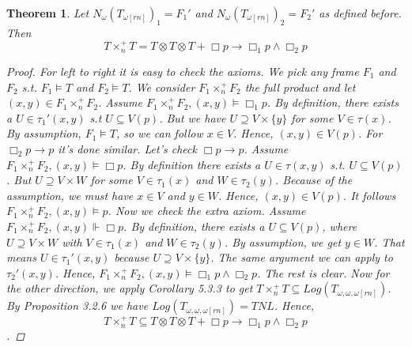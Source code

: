 \documentclass[12pt, a4paper]{scrartcl}
\newtheorem{theorem}[definition]{Theorem}
\begin{document}
    \begin{theorem}
        Let $N_\omega(T_{\omega[rn]})_1 = F_1'$ and $N_\omega(T_{\omega[rn]})_2 = F_2'$ as defined before. Then 
        $$T \times^+_n T = T \otimes T \otimes T + \Box p \rightarrow \Box_1 p \land \Box_2 p$$

        \begin{proof}
            For left to right it is easy to check the axioms. We pick any frame $F_1$ and $F_2$ s.t.
            $F_1 \vDash T$ and $F_2 \vDash T$. We consider $F_1 \times^+_n F_2$ the full product and let $(x,y) \in F_1 \times^+_n F_2$. \newline
            Assume $F_1 \times^+_n F_2,(x,y) \vDash \Box_1 p$. By definition, there exists a $U \in \tau_1'(x,y)$ s.t $U \subseteq V(p)$.
            But we have $U \supseteq V \times \{y\}$ for some $V \in \tau(x)$. By assumption, $F_1 \vDash T$, so we can follow $x \in V$. Hence, $(x,y) \in V(p)$. For $\Box_2p \rightarrow p$ it's done similar. \newline Let's check $\Box p \rightarrow p$.
            Assume $F_1 \times^+_n F_2,(x,y) \vDash \Box p$. By definition there exists a $U \in \tau(x,y)$ s.t. $U \subseteq V(p)$. But $U \supseteq V \times W$ for some $V \in \tau_1(x)$ and $W \in \tau_2(y)$.
            Because of the assumption, we must have $x \in V$ and $y \in W$. Hence, $(x,y) \in V(p)$. It follows $F_1 \times^+_n F_2,(x,y) \vDash p$. \newline
            Now we check the extra axiom.  Assume $F_1 \times^+_n F_2,(x,y) \Vdash \Box p$. By definition, there exists a $U \subseteq V(p)$, where $U \supseteq V \times W$ with $V \in \tau_1(x)$ and $W \in \tau_2(y)$. By assumption, we get $y \in W$. That means $U \in \tau_1'(x,y)$ 
            because $U \supseteq V \times \{y\}$. The same argument we can apply to $\tau_2'(x,y)$. Hence, $F_1 \times^+_n F_2,(x,y) \vDash \Box_1 p \land \Box_2 p$. The rest is clear. \newline
            Now for the other direction, we apply Corollary 5.3.3 to get $T \times^+_n T \subseteq Log(T_{\omega,\omega,\omega[rn]})$. By Proposition 3.2.6 we have
            $Log(T_{\omega,\omega,\omega[rn]}) = TNL$. Hence, 
            $$T \times^+_n T \subseteq T \otimes T \otimes T + \Box p \rightarrow \Box_1 p \land \Box_2 p$$.
            

        \end{proof}
        
    \end{theorem}
\end{document}
